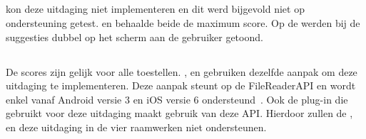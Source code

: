 \subsection{}
\label{sec:evaluatie-ondersteuning-autoaanvullen}

\st{} kon deze uitdaging niet implementeren en dit werd bijgevold niet op ondersteuning getest.
\kendo{} en \jqm{} behaalde beide de maximum score.
Op de \htc{} werden bij \lungo{} de suggesties dubbel op het scherm aan de gebruiker getoond.

% 
% 
% 

\subsection{}
\label{sec:evaluatie-ondersteuning-afbeelding}

De scores zijn gelijk voor alle toestellen.
\kendo{}, \jqm{} en \lungo{} gebruiken dezelfde aanpak om deze uitdaging te implementeren.
Deze aanpak steunt op de FileReaderAPI en wordt enkel vanaf Android versie 3 en iOS versie 6 ondersteund~\cite{Deveria2013c}.
Ook de plug-in die \st{} gebruikt voor deze uitdaging maakt gebruik van deze API.
Hierdoor zullen de \htc{},  \gtab{} en \ipadi{} deze uitdaging in de vier raamwerken niet ondersteunen.

